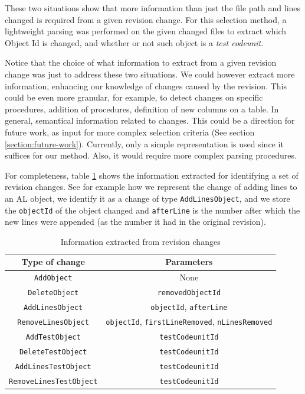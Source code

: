 \documentclass{article}
\begin{document}
These two situations show that more information than just the file path and lines changed is required from a given revision change. For this selection method, a lightweight parsing was performed on the given changed files to extract which Object Id is changed, and whether or not such object is a \emph{test codeunit}.

Notice that the choice of what information to extract from a given revision change was just to address these two situations. We could however extract more information, enhancing our knowledge of changes caused by the revision. This could be even more granular, for example, to detect changes on specific procedures, addition of procedures, definition of new columns on a table. In general, semantical information related to changes. This could be a direction for future work, as input for more complex selection criteria (See section \ref{section:future-work}). Currently, only a simple representation is used since it suffices for our method. Also, it would require more complex parsing procedures.

For completeness, table \ref{table:revision-changes} shows the information extracted for identifying a set of revision changes. See for example how we represent the change of adding lines to an AL object, we identify it as a change of type \texttt{AddLinesObject}, and we store the \texttt{objectId} of the object changed and \texttt{afterLine} is the number after which the new lines were appended (as the number it had in the original revision).

\begin{table}[H]
\centering
\begin{tabular}{||c c||} 
 \hline
 Type of change & Parameters \\
 \hline\hline
 \texttt{AddObject} & None\\
 \texttt{DeleteObject} & \texttt{removedObjectId} \\
 \texttt{AddLinesObject} & \texttt{objectId}, \texttt{afterLine} \\
 \texttt{RemoveLinesObject} & \texttt{objectId}, \texttt{firstLineRemoved}, \texttt{nLinesRemoved} \\
 \texttt{AddTestObject} & \texttt{testCodeunitId} \\
 \texttt{DeleteTestObject} & \texttt{testCodeunitId} \\
 \texttt{AddLinesTestObject} & \texttt{testCodeunitId} \\
 \texttt{RemoveLinesTestObject} & \texttt{testCodeunitId} \\
 \hline
\end{tabular}
\caption{Information extracted from revision changes}
\label{table:revision-changes}
\end{table}
\end{document}

